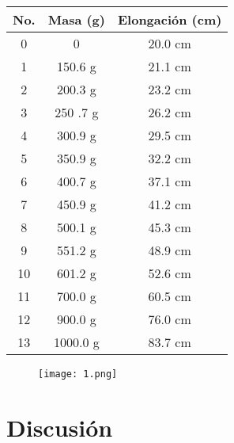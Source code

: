\documentclass[12pt,a4paper]{article}
\begin{document}
\begin{table}[h]
\begin{center}
\begin{tabular}{|c|c|c|}
\hline
No. & Masa (g) & Elongación (cm) \\
\hline
0 & 0 & 20.0 cm \\
\hline
1 & 150.6 g & 21.1 cm\\
\hline
2 & 200.3 g & 23.2 cm\\
\hline
3 & 250 .7 g & 26.2 cm\\
\hline
4 & 300.9 g & 29.5 cm\\
\hline
5 & 350.9 g & 32.2 cm\\
\hline
6 & 400.7 g & 37.1 cm\\
\hline
7 & 450.9 g & 41.2 cm\\
\hline
8 & 500.1 g & 45.3 cm\\
\hline
9 & 551.2 g & 48.9 cm\\
\hline
10 & 601.2 g & 52.6 cm \\
\hline
11 & 700.0 g & 60.5 cm \\
\hline
12 & 900.0 g &  76.0 cm\\
\hline
13 & 1000.0 g & 83.7 cm\\
\hline
\end{tabular}
\caption{}
\end{center}
\end{table}

\begin{figure}[h!]
\centering
\texttt{[image: 1.png]}
\caption{}
\end{figure}

\newpage


\section{Discusión}
\end{document}
